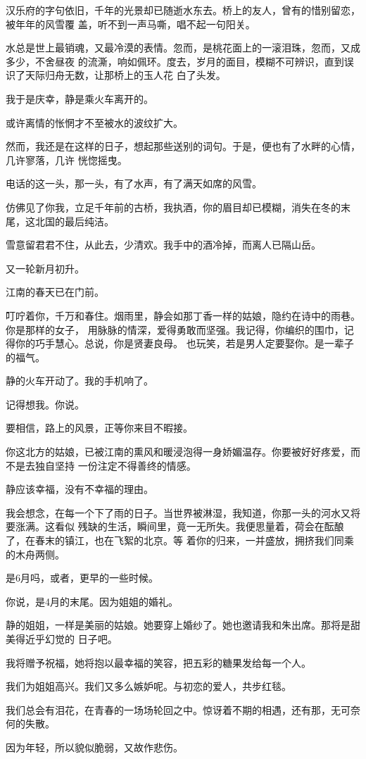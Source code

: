 		汉乐府的字句依旧，千年的光景却已随逝水东去。桥上的友人，曾有的惜别留恋，被年年的风雪覆
	盖，听不到一声马嘶，唱不起一句阳关。

		水总是世上最销魂，又最冷漠的表情。忽而，是桃花面上的一滚泪珠，忽而，又成多少，不舍昼夜
	的流澌，响如佩环。度去，岁月的面目，模糊不可辨识，直到误识了天际归舟无数，让那桥上的玉人花
	白了头发。

		我于是庆幸，静是乘火车离开的。\par
		或许离情的怅惘才不至被水的波纹扩大。

		然而，我还是在这样的日子，想起那些送别的词句。于是，便也有了水畔的心情，几许寥落，几许
	恍惚摇曳。

		电话的这一头，那一头，有了水声，有了满天如席的风雪。\par
		仿佛见了你我，立足千年前的古桥，我执酒，你的眉目却已模糊，消失在冬的末尾，这北国的最后纯洁。\par
		雪意留君君不住，从此去，少清欢。我手中的酒冷掉，而离人已隔山岳。\par
		又一轮新月初升。


		江南的春天已在门前。

		叮咛着你，千万和春住。烟雨里，静会如那丁香一样的姑娘，隐约在诗中的雨巷。你是那样的女子，
	用脉脉的情深，爱得勇敢而坚强。我记得，你编织的围巾，记得你的巧手慧心。总说，你是贤妻良母。
	也玩笑，若是男人定要娶你。是一辈子的福气。

		静的火车开动了。我的手机响了。

		记得想我。你说。

		要相信，路上的风景，正等你来目不暇接。

		你这北方的姑娘，已被江南的熏风和暖浸泡得一身娇媚温存。你要被好好疼爱，而不是去独自坚持
	一份注定不得善终的情感。

		静应该幸福，没有不幸福的理由。

		我会想念，在每一个下了雨的日子。当世界被淋湿，我知道，你那一头的河水又将要涨满。这看似
	残缺的生活，瞬间里，竟一无所失。我便思量着，荷会在酝酿了，在春末的镇江，也在飞絮的北京。等
	着你的归来，一并盛放，拥挤我们同乘的木舟两侧。

		是6月吗，或者，更早的一些时候。

		你说，是4月的末尾。因为姐姐的婚礼。

		静的姐姐，一样是美丽的姑娘。她要穿上婚纱了。她也邀请我和朱出席。那将是甜美得近乎幻觉的
	日子吧。

		我将赠予祝福，她将抱以最幸福的笑容，把五彩的糖果发给每一个人。\par
		我们为姐姐高兴。我们又多么嫉妒呢。与初恋的爱人，共步红毯。\par
		我们总会有泪花，在青春的一场场轮回之中。惊讶着不期的相遇，还有那，无可奈何的失散。\par
		因为年轻，所以貌似脆弱，又故作悲伤。


